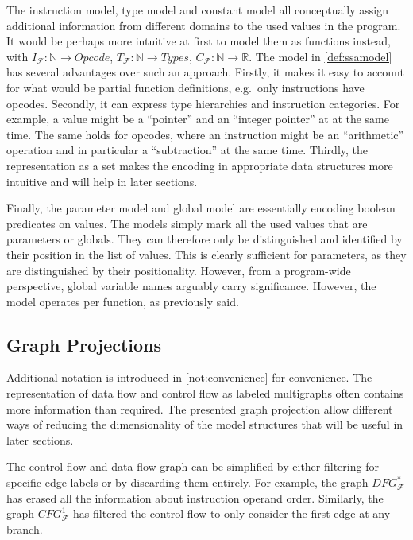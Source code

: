     The instruction model, type model and constant model all conceptually assign
    additional information from different domains to the used values in the
    program.
    It would be perhaps more intuitive at first to model them as functions
    instead, with $I_\mathcal F\colon\mathbb N\rightarrow Opcode$,
    $T_\mathcal F\colon\mathbb N\rightarrow Types$,
    $C_\mathcal F\colon\mathbb N\rightarrow \mathbb R$.
    The model in \autoref{def:ssamodel} has several advantages over such an
    approach.
    Firstly, it makes it easy to account for what would be partial function
    definitions, e.g.\ only instructions have opcodes.
    Secondly, it can express type hierarchies and instruction categories.
    For example, a value might be a ``pointer'' and an ``integer pointer'' at
    at the same time.
    The same holds for opcodes, where an instruction might be an ``arithmetic''
    operation and in particular a ``subtraction'' at the same time.
    Thirdly, the representation as a set makes the encoding in appropriate data
    structures more intuitive and will help in later sections.

    Finally, the parameter model and global model are essentially encoding
    boolean predicates on values.
    The models simply mark all the used values that are parameters or globals.
    They can therefore only be distinguished and identified by their position
    in the list of values.
    This is clearly sufficient for parameters, as they are distinguished by
    their positionality.
    However, from a program-wide perspective, global variable names arguably
    carry significance.
    However, the model operates per function, as previously said.

\subsection{Graph Projections}

    Additional notation is introduced in \autoref{not:convenience} for
    convenience.
    The representation of data flow and control flow as labeled multigraphs
    often contains more information than required.
    The presented graph projection allow different ways of reducing the
    dimensionality of the model structures that will be useful in later
    sections.

    The control flow and data flow graph can be simplified by either filtering
    for specific edge labels or by discarding them entirely.
    For example, the graph $DFG_\mathcal F^*$ has erased all the information
    about instruction operand order.
    Similarly, the graph $CFG_\mathcal F^1$ has filtered the control flow to
    only consider the first edge at any branch.

